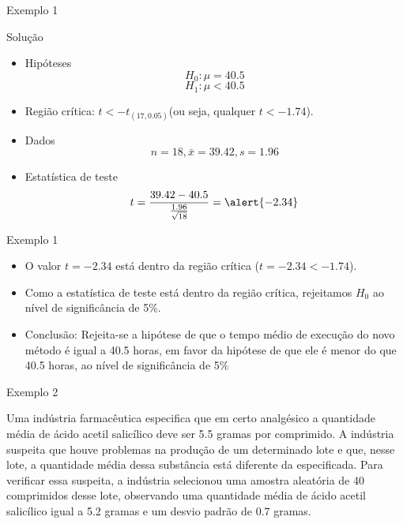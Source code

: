 \documentclass{beamer}
\begin{document}
\begin{frame}{Exemplo 1}
  \begin{block}{Solução}
    \begin{itemize}
    \item Hipóteses
      \begin{displaymath}
        H_0: \mu = 40.5
      \end{displaymath}
      \begin{displaymath}
        H_1: \mu < 40.5
      \end{displaymath}
    \item Região crítica: $t < -t_{(17,0.05)}$(ou seja, qualquer
      \alert{$t< -1.74$}).
    \item Dados
      \begin{displaymath}
        n=18, \bar{x} = 39.42, s=1.96
      \end{displaymath}
    \item Estatística de teste
      \begin{displaymath}
        t = \frac{39.42 - 40.5}{\frac{1.96}{\sqrt{18}}} = \alert{-2.34}
      \end{displaymath}
    \end{itemize}
  \end{block}
\end{frame}

\begin{frame}{Exemplo 1}
  \begin{itemize}
  \item O valor $t=-2.34$ está dentro da região crítica ($t=-2.34 < -1.74$).
  \item Como a estatística de teste está dentro da região crítica,
    rejeitamos $H_0$ ao nível de significância de 5\%.
  \item Conclusão: Rejeita-se a hipótese de que o tempo médio de
    execução do novo método é igual a 40.5 horas, em favor da hipótese
    de que ele é menor do que 40.5 horas, ao nível de significância de
    5\%
  \end{itemize}
\end{frame}

\begin{frame}{Exemplo 2}
  \begin{example}
    Uma indústria farmacêutica especifica que em certo analgésico a
    quantidade média de ácido acetil salicílico deve ser 5.5 gramas
    por comprimido. A indústria suspeita que houve problemas na
    produção de um determinado lote e que, nesse lote, a quantidade
    média dessa substância está diferente da especificada. Para
    verificar essa suspeita, a indústria selecionou uma amostra
    aleatória de 40 comprimidos desse lote, observando uma quantidade
    média de ácido acetil salicílico igual a 5.2 gramas e um desvio
    padrão de 0.7 gramas.
  \end{example}
\end{frame}
\end{document}
